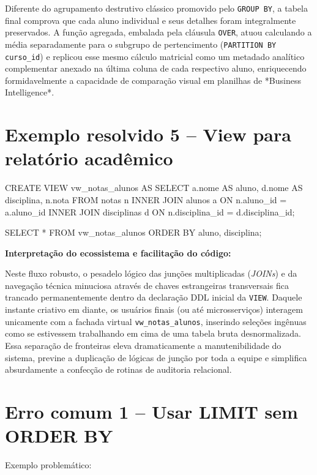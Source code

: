 Diferente do agrupamento destrutivo clássico promovido pelo \texttt{GROUP BY}, a tabela final comprova que cada aluno individual e seus detalhes foram integralmente preservados. A função agregada, embalada pela cláusula \texttt{OVER}, atuou calculando a média separadamente para o subgrupo de pertencimento (\texttt{PARTITION BY curso\_id}) e replicou esse mesmo cálculo matricial como um metadado analítico complementar anexado na última coluna de cada respectivo aluno, enriquecendo formidavelmente a capacidade de comparação visual em planilhas de *Business Intelligence*.

\section{Exemplo resolvido 5 -- View para relatório acadêmico}

\begin{sqlcode}
CREATE VIEW vw_notas_alunos AS
SELECT
    a.nome AS aluno,
    d.nome AS disciplina,
    n.nota
FROM notas n
INNER JOIN alunos a
    ON n.aluno_id = a.aluno_id
INNER JOIN disciplinas d
    ON n.disciplina_id = d.disciplina_id;
\end{sqlcode}

\begin{sqlcode}
SELECT *
FROM vw_notas_alunos
ORDER BY aluno, disciplina;
\end{sqlcode}

\textbf{Interpretação do ecossistema e facilitação do código:}

Neste fluxo robusto, o pesadelo lógico das junções multiplicadas (\textit{JOINs}) e da navegação técnica minuciosa através de chaves estrangeiras transversais fica trancado permanentemente dentro da declaração DDL inicial da \texttt{VIEW}. Daquele instante criativo em diante, os usuários finais (ou até microsserviços) interagem unicamente com a fachada virtual \texttt{vw\_notas\_alunos}, inserindo seleções ingênuas como se estivessem trabalhando em cima de uma tabela bruta desnormalizada. Essa separação de fronteiras eleva dramaticamente a manutenibilidade do sistema, previne a duplicação de lógicas de junção por toda a equipe e simplifica absurdamente a confecção de rotinas de auditoria relacional.

\section{Erro comum 1 -- Usar LIMIT sem ORDER BY}

Exemplo problemático:

